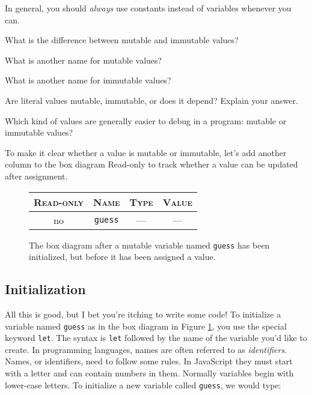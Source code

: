 \begin{center}
   In general, you should \emph{always} use constants instead of variables whenever you can.
\end{center}

\begin{question}
  What is the difference between mutable and immutable values?
\end{question}

\begin{question}
  What is another name for mutable values?
\end{question}

\begin{question}
  What is another name for immutable values?
\end{question}

\begin{question}
  Are literal values mutable, immutable, or does it depend? Explain your answer.
\end{question}

\begin{question}
  Which kind of values are generally easier to debug in a program: mutable or immutable values?
\end{question}

To make it clear whether a value is mutable or immutable, let's add another column to the box diagram \textsf{Read-only} to track whether a value can be updated after assignment.

\begin{figure}[h]
  \begin{tabular}{|c|c|c|c|}
    \hline
    \textsc{Read-only} & \textsc{Name} & \textsc{Type} & \textsc{Value}\\
    \hline
    no & \texttt{guess} & --- & ---\\
    \hline
  \end{tabular}
  \caption{\label{fig:intro-initialized-variable} The box diagram after a mutable variable named \texttt{guess} has been initialized, but before it has been assigned a value.}
\end{figure}

\subsection{Initialization}
All this is good, but I bet you're itching to write some code! To initialize a variable named \texttt{guess} as in the box diagram in Figure \ref{fig:intro-initialized-variable}, you use the special keyword \texttt{let}. The syntax is \texttt{let} followed by the name of the variable you'd like to create. In programming languages, names are often referred to as \emph{identifiers}. Names, or identifiers, need to follow some rules. In JavaScript they must start with a letter and can contain numbers in them. Normally variables begin with lower-case letters. To initialize a new variable called \texttt{guess}, we would type:

